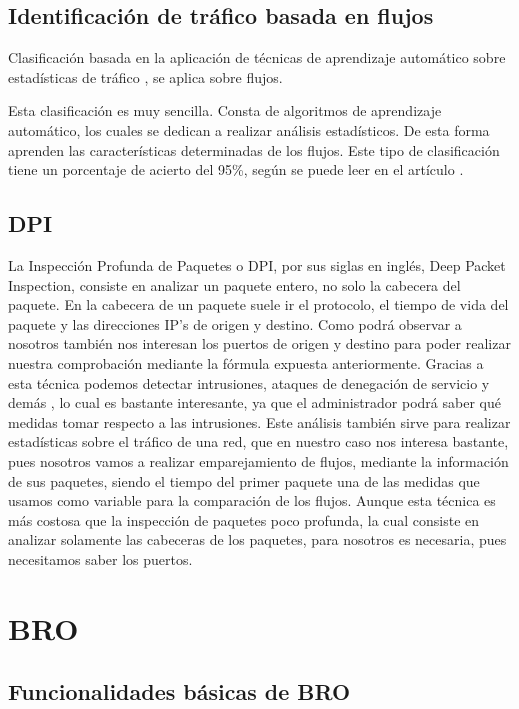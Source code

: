\subsection{Identificación de tráfico basada en flujos}

Clasificación basada en la aplicación de técnicas de aprendizaje automático sobre estadísticas 
de tráfico \cite{learning}, se aplica sobre flujos.

\intro Esta clasificación es muy sencilla. Consta de algoritmos de aprendizaje automático, los cuales se 
dedican a realizar análisis estadísticos. De esta forma aprenden las características determinadas de 
los flujos. Este tipo de clasificación tiene un porcentaje de acierto del 95\%, según se puede leer en el 
artículo \cite{comparacion}.

\subsection{DPI}
La Inspección Profunda de Paquetes o DPI, por sus siglas en inglés, Deep 
Packet Inspection, consiste en analizar un paquete entero, no solo la 
cabecera del paquete. En la cabecera de un paquete suele ir el protocolo, 
el tiempo de vida del paquete y las direcciones IP's de origen y destino. Como 
podrá observar a nosotros también nos interesan los puertos de origen y destino para poder 
realizar nuestra comprobación mediante la fórmula expuesta anteriormente.
Gracias a esta técnica podemos detectar intrusiones, ataques de denegación de servicio 
y demás \cite{dpiaproximacion}, lo cual es bastante 
interesante, ya que el administrador podrá saber qué medidas tomar respecto a las 
intrusiones. Este análisis también sirve para realizar estadísticas 
sobre el tráfico de una red, que en nuestro caso nos interesa bastante, 
pues nosotros vamos a realizar emparejamiento de flujos, mediante la 
información de sus paquetes, siendo el tiempo del primer paquete una de las 
medidas que usamos como variable para la comparación de los flujos. Aunque esta 
técnica es más costosa que la inspección de paquetes poco profunda, la 
cual consiste en analizar solamente las cabeceras de los paquetes, para nosotros es necesaria, 
pues necesitamos saber los puertos.
\section{BRO}

\subsection{Funcionalidades básicas de BRO}

